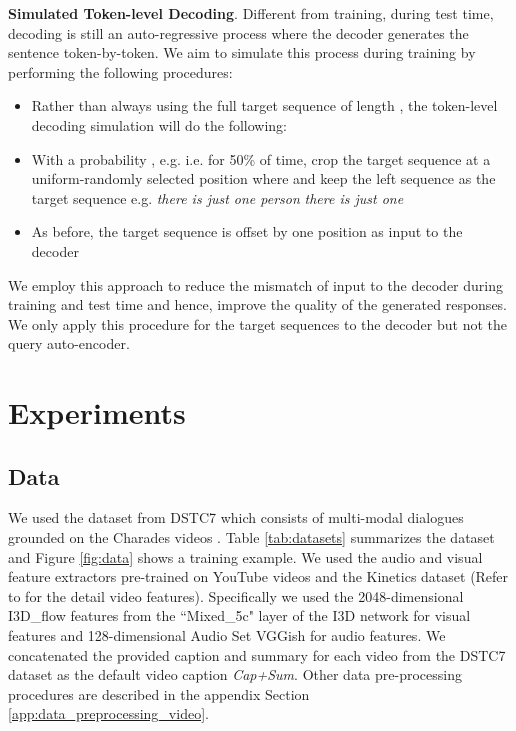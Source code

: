 \documentclass[11pt,a4paper]{article}
\begin{document}
\textbf{Simulated Token-level Decoding}. Different from training, during test time, decoding is still an auto-regressive process where the decoder generates the sentence token-by-token. We aim to simulate this process during training by performing the following procedures: 
\begin{itemize}
    \item Rather than always using the full target sequence of length , the token-level decoding simulation will do the following:
    \item With a probability , e.g.  i.e. for 50\% of time, crop the target sequence at a uniform-randomly selected position  where  and keep the left sequence as the target sequence e.g. \textit{ there is just one person }  \textit{ there is just one}
    \item As before, the target sequence is offset by one position as input to the decoder
\end{itemize}

We employ this approach to reduce the mismatch of input to the decoder during training and test time and hence, improve the quality of the generated responses. We only apply this procedure for the target sequences to the decoder but not the query auto-encoder.

\section{Experiments}


\subsection{Data}
We used the dataset from DSTC7 \cite{DSTC7} which consists of multi-modal dialogues grounded on the Charades videos \cite{sigurdsson2016hollywood}. Table \ref{tab:datasets} summarizes the dataset and Figure \ref{fig:data} shows a training example.
We used the audio and visual feature extractors pre-trained on YouTube videos and the Kinetics dataset \cite{kay2017kinetics} (Refer to \cite{hori2018end} for the detail video features). Specifically we used the 2048-dimensional I3D\_flow features from the ``Mixed\_5c" layer of the I3D network \cite{carreira2017quo} for visual features and  128-dimensional Audio Set VGGish \cite{hershey2017cnn} for audio features. 
We concatenated the provided caption and summary for each video from the DSTC7 dataset as the default video caption \textit{Cap+Sum}. Other data pre-processing procedures are described in the appendix Section \ref{app:data_preprocessing_video}. 
\end{document}

